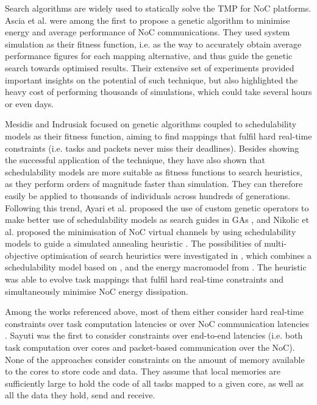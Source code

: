 \documentclass[conference]{IEEEtran}
\begin{document}
Search algorithms are widely used to statically solve the TMP for NoC platforms. Ascia et al.\cite{Ascia04} were among the first to propose a genetic algorithm to minimise energy and average performance of NoC communications. They used system simulation as their fitness function, i.e. as the way to accurately obtain average performance figures for each mapping alternative, and thus guide the genetic search towards optimised results. Their extensive set of experiments provided important insights on the potential of such technique, but also highlighted the heavy cost of performing thousands of simulations, which could take several hours or even days. 

Mesidis and Indrusiak \cite{Mesidis11genetic} focused on genetic algorithms coupled to schedulability models as their fitness function, aiming to find mappings that fulfil hard real-time constraints (i.e. tasks and packets never miss their deadlines). Besides showing the successful application of the technique, they have also shown that schedulability models are more suitable as fitness functions to search heuristics, as they perform orders of magnitude faster than simulation. They can therefore easily be applied to thousands of individuals across hundreds of generations. Following this trend, Ayari et al. proposed the use of custom genetic operators to make better use of schedulability models as search guides in GAs \cite{Ayari16}, and Nikolic et al. proposed the minimisation of NoC virtual channels by using schedulability models to guide a simulated annealing heuristic \cite{Nikolic13}. The possibilities of multi-objective optimisation of search heuristics were investigated in \cite{Sayuti13real}, which combines a schedulability model based on \cite{Shi08}, and the energy macromodel from \cite{Palesi11}. The heuristic was able to evolve task mappings that fulfil hard real-time constraints and simultaneously minimise NoC energy dissipation.

Among the works referenced above, most of them either consider hard real-time constraints over task computation latencies \cite{Ayari16} or over NoC communication latencies \cite{Nikolic13, Mesidis11genetic}. Sayuti \cite{Sayuti13real} was the first to consider constraints over end-to-end latencies (i.e. both task computation over cores and packet-based communication over the NoC). None of the approaches consider constraints on the amount of memory available to the cores to store code and data. They assume that local memories are sufficiently large to hold the code of all tasks mapped to a given core, as well as all the data they hold, send and receive.  
\end{document}
